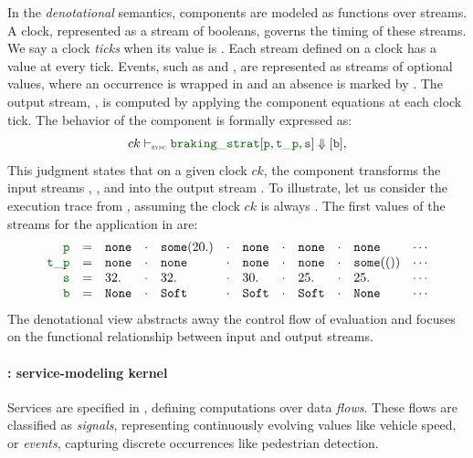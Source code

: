 In the \emph{denotational} semantics, components are modeled as functions over streams.
A clock, represented as a stream of booleans, governs the timing of these streams. We say
a clock \emph{ticks} when its value is \true. Each stream defined on a clock has a value
at every tick.
%
Events, such as  and , are represented as streams of optional values,
where an occurrence is wrapped in  and an absence is marked by \none. The output
stream, \eg {}, is computed by applying the component equations at each clock tick.
The behavior of the  component is formally expressed as:
\begin{equation*}
  ck \vdashSync \idf{braking\_strat}[\idf{p}, \idf{t\_p}, \idf{s}] \Downarrow [\idf{b}],
\end{equation*}
This judgment states that on a given clock $ck$, the component transforms the input
streams , , and  into the output stream .
%
To illustrate, let us consider the execution trace from
, assuming the clock $ck$ is always \true.
The first values of the streams for the application in  are:%
\setlength{\arraycolsep}{2pt}%
\begin{equation*}
  \begin{array}{rrlllllllllll}
    \idf{p}    & = & \none & \step & \some{20.} & \step & \none & \step & \none & \step & \none     & \cdots \\
    \idf{t\_p} & = & \none & \step & \none      & \step & \none & \step & \none & \step & \some{()} & \cdots \\
    \idf{s}    & = & 32.   & \step & 32.        & \step & 30.   & \step & 25.   & \step & 25.       & \cdots \\
    \idf{b}    & = & \No   & \step & \Soft      & \step & \Soft & \step & \Soft & \step & \No       & \cdots
  \end{array}
\end{equation*}%
\setlength{\arraycolsep}{5pt}%
%
The denotational view abstracts away the control flow of evaluation and focuses on the functional
relationship between input and output streams.

\paragraph{\GRFRP: service-modeling kernel}
%
Services are specified in \GRFRP, defining computations over data \emph{flows}.
These flows are classified as \emph{signals}, representing continuously evolving values like
vehicle speed, or \emph{events}, capturing discrete occurrences like pedestrian detection.

